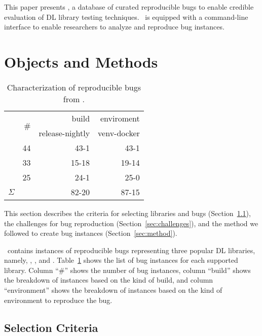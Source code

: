 \documentclass[sigconf,screen]{acmart}
\begin{document}
This paper presents \tname, a database of curated reproducible bugs to
enable credible evaluation of DL library testing techniques. \tname\ is
equipped with a command-line interface to enable researchers to analyze
and reproduce bug instances.


\section{Objects and Methods}

\begin{table}
  \centering
  \caption{\label{table:bug-characterization}Characterization of
    reproducible bugs from \tname.}
\begin{tabular}{l|rrr}
  \toprule & \multirow{2}{*}{\#} & \multicolumn{1}{r}{build} &
  \multicolumn{1}{r}{enviroment} \\ & & release-nightly & venv-docker
  \\ \cmidrule(lr){2-4} \jax{} & 44 & 43-1 & 43-1 \\ \torch{} & 33 &
  15-18 & 19-14 \\ \tf{} & 25 & 24-1 & 25-0 \\ \midrule
  \multicolumn{1}{c|}{$\Sigma$} & \numbugs{} & 82-20 & 87-15
  \\ \bottomrule
\end{tabular}
\end{table}

This section describes the criteria for selecting libraries and bugs
(Section~\ref{sec:selection-criterion}), the challenges for bug
reproduction (Section~\ref{sec:challenges}), and the method we
followed to create bug instances (Section~\ref{sec:method}).

\tname\ contains \numbugs{} instances of reproducible bugs
representing three popular DL libraries, namely, \jax, \tf, and
\torch. Table~\ref{table:bug-characterization} shows the list of bug
instances for each supported library. Column ``\#'' shows the number
of bug instances, column ``build'' shows the breakdown of instances
based on the kind of build, and column ``environment'' shows the
breakdown of instances based on the kind of environment to reproduce
the bug.

\subsection{Selection Criteria}
\label{sec:selection-criterion}
\end{document}
